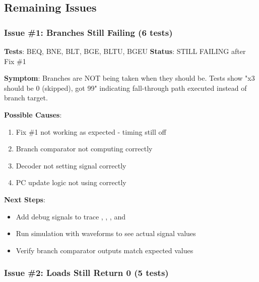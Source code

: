 \subsection{\texorpdfstring{\bad{} Remaining Issues}{ Remaining Issues}}\label{cr:fix:rtl-bug-fixes:x-remaining-issues}

\subsubsection{Issue \#1: Branches Still Failing (6 tests)}\label{cr:fix:rtl-bug-fixes:issue-1-branches-still-failing-6-tests}

\begin{record}

\textbf{Tests}: BEQ, BNE, BLT, BGE, BLTU, BGEU \textbf{Status}: \bad{}
STILL FAILING after Fix \#1

\textbf{Symptom}: Branches are NOT being taken when they should be.
Tests show "x3 should be 0 (skipped), got 99" indicating fall-through
path executed instead of branch target.

\textbf{Possible Causes}:

\begin{enumerate}
\def\labelenumi{\arabic{enumi}.}
\tightlist
\item
  Fix \#1 not working as expected - timing still off
\item
  Branch comparator not computing  correctly
\item
  Decoder not setting  signal correctly
\item
  PC update logic not using  correctly
\end{enumerate}

\textbf{Next Steps}:

\begin{itemize}
\tightlist
\item
  Add debug signals to trace , ,
  , and 
\item
  Run simulation with waveforms to see actual signal values
\item
  Verify branch comparator outputs match expected values
\end{itemize}

\end{record}

\subsubsection{Issue \#2: Loads Still Return 0 (5 tests)}\label{cr:fix:rtl-bug-fixes:issue-2-loads-still-return-0-5-tests}

